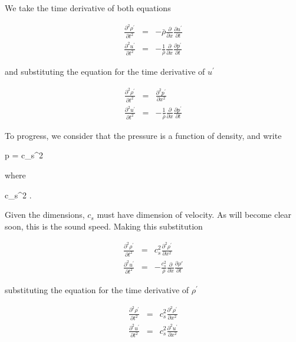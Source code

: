 We take the time derivative of both equations 


\begin{eqnarray}
\frac{\partial^2 \rho^\prime}{\partial t^2}   &=& -\bar{\rho}\frac{\partial }{\partial x} \frac{\partial u^\prime}{\partial t}  \\
\frac{\partial^2 u^\prime}{\partial t^2}   &=& -\frac{1}{\bar{\rho}} \frac{\partial }{\partial x} \frac{\partial p^\prime}{\partial t} 
\end{eqnarray}

and substituting the equation for the time derivative of $u^\prime$

\begin{eqnarray}
\frac{\partial^2 \rho^\prime}{\partial t^2}   &=& \frac{\partial^2 p^\prime}{\partial x^2} \\
\frac{\partial^2 u^\prime}{\partial t^2}   &=& -\frac{1}{\bar{\rho}} \frac{\partial }{\partial x} \frac{\partial p^\prime}{\partial t} 
\end{eqnarray}



To progress, we consider that the pressure is a function of density,
and write

\beq
\partial p = \partial \rho c_s^2 
\eeq

where

\beq
c_s^2 \equiv {}.
\eeq

Given the dimensions, $c_s$ must have dimension of velocity. As will become clear soon, this is
the sound speed. Making this substitution


\begin{eqnarray}
\frac{\partial^2 \rho^\prime}{\partial t^2}   &=& c_s^2 \frac{\partial^2 \rho^\prime}{\partial x^2} \\
\frac{\partial^2 u^\prime}{\partial t^2}   &=& -\frac{c_s^2}{\bar{\rho}} \frac{\partial }{\partial x} \frac{\partial \rho\prime}{\partial t} 
\end{eqnarray}

substituting the equation for the time derivative of $\rho^\prime$

\begin{eqnarray}
\frac{\partial^2 \rho^\prime}{\partial t^2}   &=& c_s^2 \frac{\partial^2 \rho^\prime}{\partial x^2} \\
\frac{\partial^2 u^\prime}{\partial t^2}   &=& c_s^2 \frac{\partial^2 u^\prime}{\partial x^2}
\end{eqnarray}

